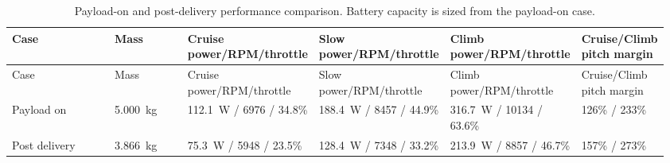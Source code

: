 \documentclass[11pt]{article}
\begin{document}
\begin{longtable}{@{}p{0.18\linewidth}p{0.12\linewidth}p{0.18\linewidth}p{0.18\linewidth}p{0.18\linewidth}p{0.12\linewidth}@{}}
\caption{Payload-on and post-delivery performance comparison. Battery capacity is sized from the payload-on case.}\label{tab:exec-payload-performance}\\
\toprule
Case & Mass & Cruise power/RPM/throttle & Slow power/RPM/throttle & Climb power/RPM/throttle & Cruise/Climb pitch margin \\
\midrule
\endfirsthead
\toprule
Case & Mass & Cruise power/RPM/throttle & Slow power/RPM/throttle & Climb power/RPM/throttle & Cruise/Climb pitch margin \\
\midrule
\endhead
Payload on & \SI{5.000}{kg} & \SI{112.1}{W} / \num{6976} / 34.8\% & \SI{188.4}{W} / \num{8457} / 44.9\% & \SI{316.7}{W} / \num{10134} / 63.6\% & 126\% / 233\% \\
Post delivery & \SI{3.866}{kg} & \SI{75.3}{W} / \num{5948} / 23.5\% & \SI{128.4}{W} / \num{7348} / 33.2\% & \SI{213.9}{W} / \num{8857} / 46.7\% & 157\% / 273\% \\
\bottomrule
\end{longtable}
\end{document}
